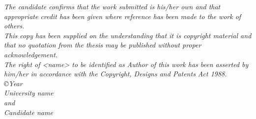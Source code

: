 \cleardoublepage
\begin{center}
\textit{
The candidate confirms that the work submitted is his/her own and that appropriate credit has been given where reference has been made to the work of others.\\
\hfill\break
This copy has been supplied on the understanding that it is copyright material and that no quotation from the thesis may be published without proper acknowledgement.\\
\hfill\break
The right of <name> to be identified as Author of this work has been asserted by him/her in accordance with the Copyright, Designs and Patents Act 1988.\\
\vfill
\copyright Year\\ University name\\ and\\ Candidate name
}
\end{center}

